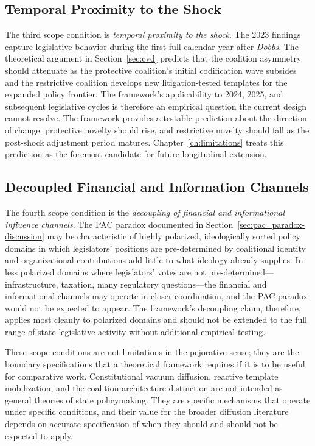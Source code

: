 \subsection{Temporal Proximity to the Shock}
The third scope condition is \emph{temporal proximity to the shock}. The 2023 findings capture legislative behavior during the first full calendar year after \textit{Dobbs}. The theoretical argument in Section~\ref{sec:cvd} predicts that the coalition asymmetry should attenuate as the protective coalition's initial codification wave subsides and the restrictive coalition develops new litigation-tested templates for the expanded policy frontier. The framework's applicability to 2024, 2025, and subsequent legislative cycles is therefore an empirical question the current design cannot resolve. The framework provides a testable prediction about the direction of change: protective novelty should rise, and restrictive novelty should fall as the post-shock adjustment period matures. Chapter~\ref{ch:limitations} treats this prediction as the foremost candidate for future longitudinal extension.
 
\subsection{Decoupled Financial and Information Channels}
The fourth scope condition is the \emph{decoupling of financial and informational influence channels}. The PAC paradox documented in Section~\ref{sec:pac_paradox-discussion} may be characteristic of highly polarized, ideologically sorted policy domains in which legislators' positions are pre-determined by coalitional identity and organizational contributions add little to what ideology already supplies. In less polarized domains where legislators' votes are not pre-determined---infrastructure, taxation, many regulatory questions---the financial and informational channels may operate in closer coordination, and the PAC paradox would not be expected to appear. The framework's decoupling claim, therefore, applies most cleanly to polarized domains and should not be extended to the full range of state legislative activity without additional empirical testing.
 
These scope conditions are not limitations in the pejorative sense; they are the boundary specifications that a theoretical framework requires if it is to be useful for comparative work. Constitutional vacuum diffusion, reactive template mobilization, and the coalition-architecture distinction are not intended as general theories of state policymaking. They are specific mechanisms that operate under specific conditions, and their value for the broader diffusion literature depends on accurate specification of when they should and should not be expected to apply.
 
